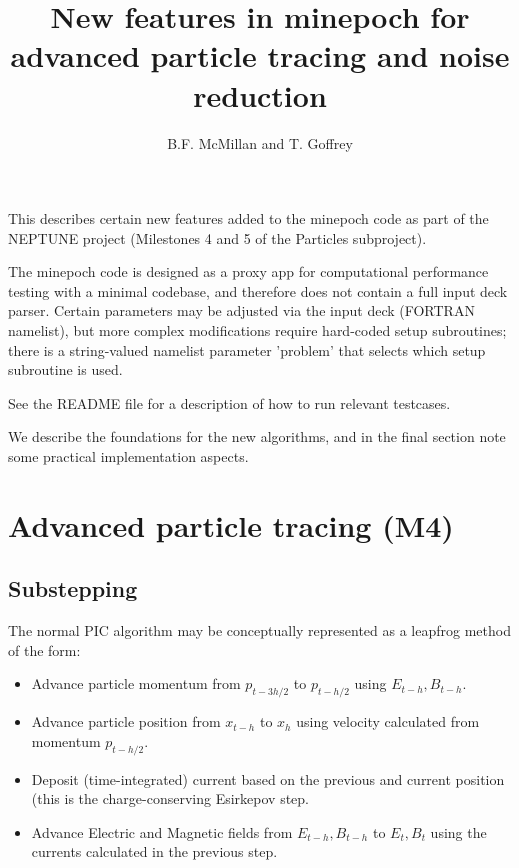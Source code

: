 \documentclass{article}
\title{New features in minepoch for advanced particle tracing and noise reduction}
\author{B.F. McMillan and T. Goffrey}
\begin{document}
\maketitle

This describes certain new features added to the minepoch code as part of the NEPTUNE project (Milestones 4 and 5 of the Particles subproject).

The minepoch code is designed as a proxy app for computational performance testing with a minimal codebase, and therefore does not contain a full input deck parser. Certain parameters may be adjusted via the input deck (FORTRAN namelist), but more complex modifications require hard-coded setup subroutines; there is a string-valued namelist parameter 'problem' that selects which setup subroutine is used. 

See the README file for a description of how to run relevant testcases.

We describe the foundations for the new algorithms, and in the final section note some practical implementation aspects.

\section{Advanced particle tracing (M4)}

\subsection{Substepping}

The normal PIC algorithm\cite{Arber_EPOCH} may be conceptually represented as a leapfrog method of the form:

\begin{itemize}
\item
  Advance particle momentum from $p_{t-3 h/2}$ to $p_{t-h/2}$ using $E_{t-h}, B_{t-h}$.
\item
  Advance particle position from $x_{t-h}$ to $x_{h}$ using velocity calculated from momentum $p_{t-h/2}$.
\item
  Deposit (time-integrated) current based on the previous and current
  position (this is the charge-conserving Esirkepov step\cite{ESIRKEPOV2001}.
\item
  Advance Electric and Magnetic fields from $E_{t-h}, B_{t-h}$ to $E_t, B_t$ using the currents calculated in the previous step.
\end{itemize}
\end{document}
